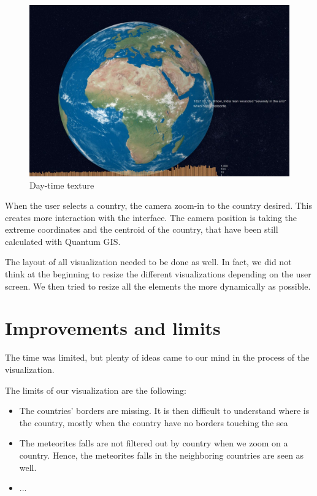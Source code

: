 \documentclass[10pt,conference,compsocconf]{IEEEtran}
\begin{document}
\begin{figure}[H]
  \centering
  \includegraphics[width=\columnwidth]{images/day_time_texture}
  \caption{Day-time texture}
  \label{fig:day_time}
\end{figure}


When the user selects a country, the camera zoom-in to the country desired. This creates more interaction with the interface. The camera position is taking the extreme coordinates and the centroid of the country, that have been still calculated with Quantum GIS. 

The layout of all visualization needed to be done as well. In fact, we did not think at the beginning to resize the different visualizations depending on the user screen. We then tried to resize all the elements the more dynamically as possible. 



\section{Improvements and limits}
\label{sec:improvements}
The time was limited, but plenty of ideas came to our mind in the process of the visualization. 

The limits of our visualization are the following: 

\begin{itemize}
\item The countries' borders are missing. It is then difficult to understand where is the country, mostly when the country have no borders touching the sea

\item The meteorites falls are not filtered out by country when we zoom on a country. Hence, the meteorites falls in the neighboring countries are seen as well. 
 
\item ...
\end{itemize}
\end{document}
